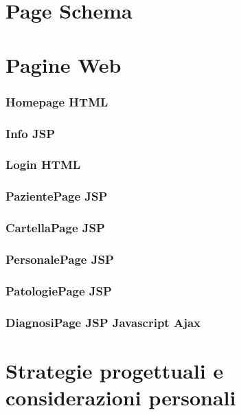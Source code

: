 \documentclass[a4paper,titlepage]{article}
\begin{document}
\newpage
\part{Page Schema}





\part{Pagine Web}

\section{Homepage HTML}

\section{Info JSP}

\section{Login HTML}

\section{PazientePage JSP}

\section{CartellaPage JSP}

\section{PersonalePage JSP}

\section{PatologiePage JSP}

\section{DiagnosiPage JSP Javascript Ajax} 


\part{Strategie progettuali e considerazioni personali}
\end{document}
